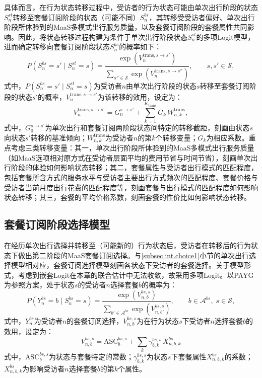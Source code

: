 具体而言，在行为状态转移过程中，受访者的行为状态可能由单次出行阶段的状态$S_n^{st}$转移至套餐订阅阶段的状态（可能不同）$S_n^{bs}$，其转移受受访者偏好、单次出行阶段所体验到的MaaS多模式出行服务质量，以及套餐订阅阶段的套餐属性共同影响。因此，将状态转移过程构建为条件于单次出行阶段状态$S_n^{st}$的多项Logit模型，进而确定转移向套餐订阅阶段状态$S_n^{bs}$的概率如下：
\begin{equation}\label{eq.int.trans}
P\!\left(S_n^{bs}=s'\mid S_n^{st}=s\right)=\frac{\exp\!\left(V_n^{\mathrm{trans},s\to s'}\right)}{\sum_{s''\in\mathcal{S}}\exp\!\left(V_n^{\mathrm{trans},s\to s''}\right)},\qquad s,s'\in\mathcal{S},
\end{equation}
式中，$P\!\left(S_n^{bs}=s'\mid S_n^{st}=s\right)$为受访者$n$由单次出行阶段的状态$s$转移至套餐订阅阶段的状态$s'$的概率，$V_n^{\mathrm{trans},s\to s'}$为该转移的效用，设定为：
\begin{equation}\label{eq.int.transV}
V_n^{\mathrm{trans},s\to s'}=G_0^{s\to s'}+\sum_{k=1}^{K_{\mathrm{trans}}}G_k\, W_{n,k}^{\mathrm{trans}},
\end{equation}
式中，$G_0^{s\to s'}$为单次出行和套餐订阅两阶段状态间特定的转移截距，刻画由状态$s$向状态$s'$转移的基准倾向；$W_{n,k}^{\mathrm{trans}}$为受访者$n$的第$k$个转移变量；$G_k$为相应系数。重点考虑三类转移变量：其一，单次出行阶段所体验到的MaaS多模式出行服务质量（如MaaS选项相对原方式在受访者层面平均的费用节省与时间节省），刻画单次出行阶段的体验如何影响状态转移；其二，套餐属性与受访者出行模式的匹配程度，包括套餐所含方式的服务水平与受访者主要出行方式频次的匹配程度、套餐价格与受访者当前月度出行花费的匹配程度等，刻画套餐与出行模式的匹配程度如何影响状态转移；其三，套餐的平均价格系数，刻画套餐的性价比如何影响状态转移。

\subsection{套餐订阅阶段选择模型}\label{subsec.int.choice2}

在经历单次出行选择并转移至（可能新的）行为状态后，受访者在转移后的行为状态下做出第二阶段的MaaS套餐订阅选择。与\ref{subsec.int.choice1}小节的单次出行选择模型相对应，套餐订阅选择模型刻画各状态下受访者的套餐选择。关于模型形式，考虑到嵌套Logit在本章的联合估计中无法收敛，故采用多项Logit。以PAYG为参照方案，处于状态$s$的受访者$n$选择套餐$b$的概率为：
\begin{equation}\label{eq.int.choice2}
P\!\left(Y_{n}^{bs}=b\mid S_n^{bs}=s\right)=\frac{\exp\!\left(V_{n,b}^{bs,s}\right)}{\sum_{b'\in\mathcal{A}^{bs}}\exp\!\left(V_{n,b'}^{bs,s}\right)},\qquad b\in\mathcal{A}^{bs},\; s\in\mathcal{S},
\end{equation}
式中，$Y_n^{bs}$为受访者$n$的套餐订阅选择，$V_{n,b}^{bs,s}$为在行为状态$s$下受访者$n$选择套餐$b$的效用，设定为：
\begin{equation}\label{eq.int.choice2V}
V_{n,b}^{bs,s}=\mathrm{ASC}_{b}^{bs,s}+\sum_{k}\gamma_{b,k}^{bs,s}\, X_{n,b,k}^{bs}
\end{equation}
式中，$\mathrm{ASC}_{b}^{bs,s}$为状态与套餐特定的常数；$\gamma_{b,k}^{bs,s}$为状态$s$下套餐属性$X_{n,b,k}^{bs}$的系数；$X_{n,b,k}^{bs}$为影响受访者$n$选择套餐$b$的第$k$个属性。

